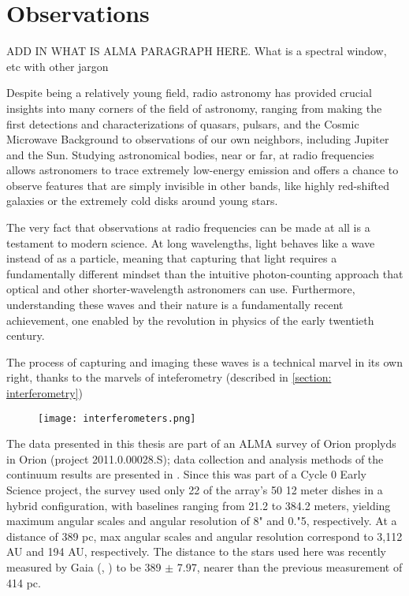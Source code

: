 \chapter{Observations}
\label{chap:observations}

ADD IN WHAT IS ALMA PARAGRAPH HERE. What is a spectral window, etc with other jargon

Despite being a relatively young field, radio astronomy has provided crucial insights into many corners of the field of astronomy, ranging from making the first detections and characterizations of quasars, pulsars, and the Cosmic Microwave Background to observations of our own neighbors, including Jupiter and the Sun. Studying astronomical bodies, near or far, at radio frequencies allows astronomers to trace extremely low-energy emission and offers a chance to observe features that are simply invisible in other bands, like highly red-shifted galaxies or the extremely cold disks around young stars.

The very fact that observations at radio frequencies can be made at all is a testament to modern science. At long wavelengths, light behaves like a wave instead of as a particle, meaning that capturing that light requires a fundamentally different mindset than the intuitive photon-counting approach that optical and other shorter-wavelength astronomers can use. Furthermore, understanding these waves and their nature is a fundamentally recent achievement, one enabled by the revolution in physics of the early twentieth century.

The process of capturing and imaging these waves is a technical marvel in its own right, thanks to the marvels of inteferometry (described in \ref{section: interferometry})


\begin{figure}[b]
  \centering
  \texttt{[image: interferometers.png]}
  \label{fig:interferometers}
\end{figure}





The data presented in this thesis are part of an ALMA survey of Orion proplyds in Orion (project 2011.0.00028.S); data collection and analysis methods of the continuum results are presented in \citet{mann_alma_2014}. Since this was part of a Cycle 0 Early Science project, the survey used only 22 of the array's 50 12 meter dishes in a hybrid configuration, with baselines ranging from 21.2 to 384.2 meters, yielding maximum angular scales and angular resolution of 8" and 0."5, respectively. At a distance of 389 pc, max angular scales and angular resolution correspond to 3,112 AU and 194 AU, respectively. The distance to the stars used here was recently measured by Gaia (\citet{gaia_collaboration_gaia_2016}, \citet{gaia_collaboration_gaia_2018}) to be 389 $\pm$ 7.97, nearer than the previous measurement of 414 pc.
\bigskip


